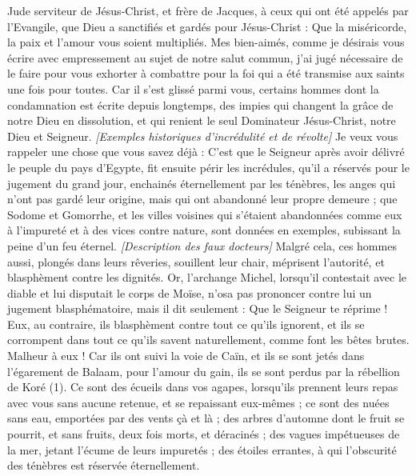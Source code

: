 \BFont
\begin{multicols}{2}
\TextTitle{[Introduction]}
\VerseOne{}Jude serviteur de Jésus-Christ, et frère de Jacques, à ceux qui ont été appelés par l'Evangile, que Dieu a sanctifiés et gardés pour Jésus-Christ :
Que la miséricorde, la paix et l'amour vous soient multipliés.
Mes bien-aimés, comme je désirais vous écrire avec empressement au sujet de notre salut commun, j’ai jugé nécessaire de le faire pour vous exhorter à combattre pour la foi qui a été transmise aux saints une fois pour toutes.
Car il s’est glissé parmi vous, certains hommes dont la condamnation est écrite depuis longtemps, des impies qui changent la grâce de notre Dieu en dissolution, et qui renient le seul Dominateur Jésus-Christ, notre Dieu et Seigneur.
\textit{[Exemples historiques d'incrédulité et de révolte]}
Je veux vous rappeler une chose que vous savez déjà : C'est que le Seigneur après avoir délivré le peuple du pays d'Egypte, fit ensuite périr les incrédules,
qu’il a réservés pour le jugement du grand jour, enchainés éternellement par les ténèbres, les anges qui n'ont pas gardé leur origine, mais qui ont abandonné leur propre demeure ;
que Sodome et Gomorrhe, et les villes voisines qui s'étaient abandonnées comme eux à l'impureté et à des vices contre nature, sont données en exemples, subissant la peine d’un feu éternel.
\textit{[Description des faux docteurs]}
Malgré cela, ces hommes aussi, plongés dans leurs rêveries, souillent leur chair, méprisent l’autorité, et blasphèment contre les dignités.
Or, l'archange Michel, lorsqu’il contestait avec le diable et lui disputait le corps de Moïse, n'osa pas prononcer contre lui un jugement blasphématoire, mais il dit seulement : Que le Seigneur te réprime !
Eux, au contraire, ils blasphèment contre tout ce qu'ils ignorent, et ils se corrompent dans tout ce qu'ils savent naturellement, comme font les bêtes brutes.
Malheur à eux ! Car ils ont suivi la voie de Caïn, et ils se sont jetés dans l’égarement de Balaam, pour l’amour du gain, ils se sont perdus par la rébellion de Koré (1).
Ce sont des écueils dans vos agapes, lorsqu’ils prennent leurs repas avec vous sans aucune retenue, et se repaissant eux-mêmes ; ce sont des nuées sans eau, emportées par des vents çà et là ; des arbres d’automne dont le fruit se pourrit, et sans fruits, deux fois morts, et déracinés ;
des vagues impétueuses de la mer, jetant l'écume de leurs impuretés ; des étoiles errantes, à qui l'obscurité des ténèbres est réservée éternellement.

\end{multicols}
